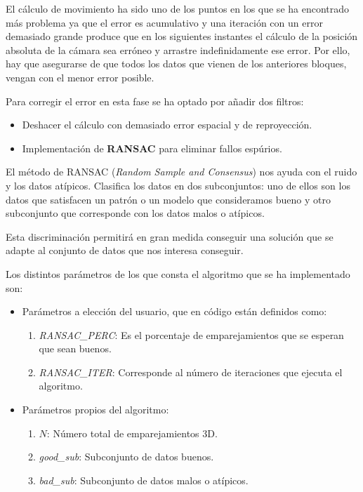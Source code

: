 El cálculo de movimiento ha sido uno de los puntos en los que se ha encontrado más problema ya que el error es acumulativo y una iteración con un error demasiado grande produce que en los siguientes instantes el cálculo de la posición absoluta de la cámara sea erróneo y arrastre indefinidamente ese error. Por ello, hay que asegurarse de que todos los datos que vienen de los anteriores bloques, vengan con el menor error posible.

Para corregir el error en esta fase se ha optado por añadir dos filtros:

\begin{itemize}
\item Deshacer el cálculo con demasiado error espacial y de reproyección.
\item Implementación de \textbf{RANSAC} para eliminar fallos espúrios.
\end{itemize}

El método de RANSAC (\textit{Random Sample and Consensus}) nos ayuda con el ruido y los datos atípicos. Clasifica los datos en dos subconjuntos: uno de ellos son los datos que satisfacen un patrón o un modelo que consideramos bueno y otro subconjunto que corresponde con los datos malos o atípicos.

Esta discriminación permitirá en gran medida conseguir una solución que se adapte al conjunto de datos que nos interesa conseguir.

Los distintos parámetros de los que consta el algoritmo que se ha implementado son:

\begin{itemize}
\item Parámetros a elección del usuario, que en código están definidos como:

\begin{enumerate}
\item \textit{RANSAC\_PERC}: Es el porcentaje de emparejamientos que se esperan que sean buenos.
\item \textit{RANSAC\_ITER}: Corresponde al número de iteraciones que ejecuta el algoritmo.
\end{enumerate}
\item Parámetros propios del algoritmo:

\begin{enumerate}
\item $N$: Número total de emparejamientos 3D.
\item \textit{good\_sub}: Subconjunto de datos buenos.
\item \textit{bad\_sub}: Subconjunto de datos malos o atípicos.
\end{enumerate}
\end{itemize}

